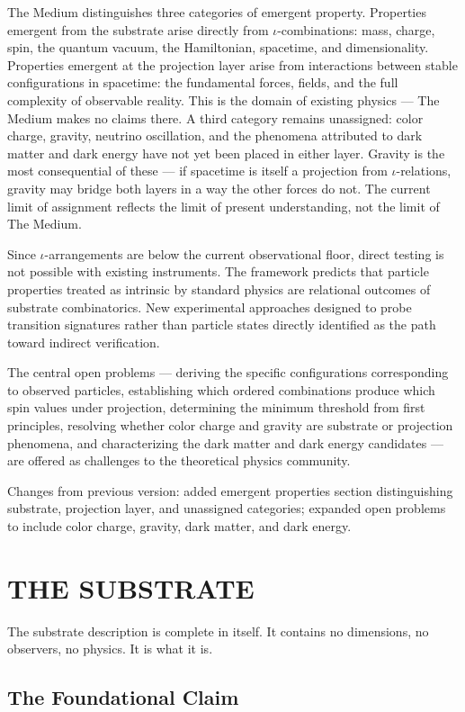 \documentclass[11pt,letterpaper]{article}
\begin{document}
The Medium distinguishes three categories of emergent property. Properties emergent from the substrate arise directly from \(\iota\)-combinations: mass, charge, spin, the quantum vacuum, the Hamiltonian, spacetime, and dimensionality. Properties emergent at the projection layer arise from interactions between stable configurations in spacetime: the fundamental forces, fields, and the full complexity of observable reality. This is the domain of existing physics — The Medium makes no claims there. A third category remains unassigned: color charge, gravity, neutrino oscillation, and the phenomena attributed to dark matter and dark energy have not yet been placed in either layer. Gravity is the most consequential of these — if spacetime is itself a projection from \(\iota\)-relations, gravity may bridge both layers in a way the other forces do not. The current limit of assignment reflects the limit of present understanding, not the limit of The Medium.

Since \(\iota\)-arrangements are below the current observational floor, direct testing is not possible with existing instruments. The framework predicts that particle properties treated as intrinsic by standard physics are relational outcomes of substrate combinatorics. New experimental approaches designed to probe transition signatures rather than particle states directly identified as the path toward indirect verification.

The central open problems — deriving the specific configurations corresponding to observed particles, establishing which ordered combinations produce which spin values under projection, determining the minimum threshold from first principles, resolving whether color charge and gravity are substrate or projection phenomena, and characterizing the dark matter and dark energy candidates — are offered as challenges to the theoretical physics community.

Changes from previous version: added emergent properties section distinguishing substrate, projection layer, and unassigned categories; expanded open problems to include color charge, gravity, dark matter, and dark energy.
\section{THE SUBSTRATE}
\label{sec:org2bb4192}

The substrate description is complete in itself. It contains no dimensions, no observers, no physics. It is what it is.
\subsection{The Foundational Claim}
\label{sec:org8f85d58}
\end{document}
